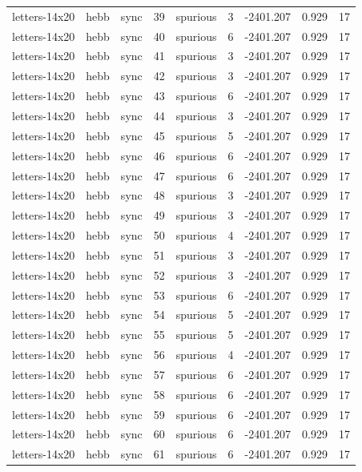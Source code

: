 \begin{tabular}{lllrlrrrr}
letters-14x20 & hebb & sync & 39 & spurious & 3 & -2401.207 & 0.929 & 17 \\
letters-14x20 & hebb & sync & 40 & spurious & 6 & -2401.207 & 0.929 & 17 \\
letters-14x20 & hebb & sync & 41 & spurious & 3 & -2401.207 & 0.929 & 17 \\
letters-14x20 & hebb & sync & 42 & spurious & 3 & -2401.207 & 0.929 & 17 \\
letters-14x20 & hebb & sync & 43 & spurious & 6 & -2401.207 & 0.929 & 17 \\
letters-14x20 & hebb & sync & 44 & spurious & 3 & -2401.207 & 0.929 & 17 \\
letters-14x20 & hebb & sync & 45 & spurious & 5 & -2401.207 & 0.929 & 17 \\
letters-14x20 & hebb & sync & 46 & spurious & 6 & -2401.207 & 0.929 & 17 \\
letters-14x20 & hebb & sync & 47 & spurious & 6 & -2401.207 & 0.929 & 17 \\
letters-14x20 & hebb & sync & 48 & spurious & 3 & -2401.207 & 0.929 & 17 \\
letters-14x20 & hebb & sync & 49 & spurious & 3 & -2401.207 & 0.929 & 17 \\
letters-14x20 & hebb & sync & 50 & spurious & 4 & -2401.207 & 0.929 & 17 \\
letters-14x20 & hebb & sync & 51 & spurious & 3 & -2401.207 & 0.929 & 17 \\
letters-14x20 & hebb & sync & 52 & spurious & 3 & -2401.207 & 0.929 & 17 \\
letters-14x20 & hebb & sync & 53 & spurious & 6 & -2401.207 & 0.929 & 17 \\
letters-14x20 & hebb & sync & 54 & spurious & 5 & -2401.207 & 0.929 & 17 \\
letters-14x20 & hebb & sync & 55 & spurious & 5 & -2401.207 & 0.929 & 17 \\
letters-14x20 & hebb & sync & 56 & spurious & 4 & -2401.207 & 0.929 & 17 \\
letters-14x20 & hebb & sync & 57 & spurious & 6 & -2401.207 & 0.929 & 17 \\
letters-14x20 & hebb & sync & 58 & spurious & 6 & -2401.207 & 0.929 & 17 \\
letters-14x20 & hebb & sync & 59 & spurious & 6 & -2401.207 & 0.929 & 17 \\
letters-14x20 & hebb & sync & 60 & spurious & 6 & -2401.207 & 0.929 & 17 \\
letters-14x20 & hebb & sync & 61 & spurious & 6 & -2401.207 & 0.929 & 17 \\

\end{tabular}
